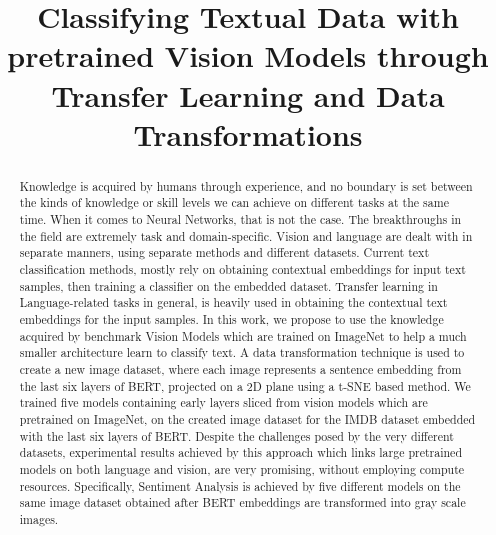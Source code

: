 \documentclass[conference]{IEEEtran}
\begin{document}
\title{Classifying Textual Data with pretrained Vision Models through Transfer Learning and Data \\
Transformations
}


\author{
}

\maketitle


\begin{abstract}
Knowledge is acquired by humans through experience, and no boundary is set between the kinds of knowledge or skill levels we can achieve on different tasks at the same time. When it comes to Neural Networks, that is not the case. The breakthroughs in the field are extremely task and domain-specific. Vision and language are dealt with in separate manners, using separate methods and different datasets. Current text classification methods, mostly rely on obtaining contextual embeddings for input text samples, then training a classifier on the embedded dataset. Transfer learning in Language-related tasks in general, is heavily used in obtaining the contextual text embeddings for the input samples. 
In this work, we propose to use the knowledge acquired by benchmark Vision Models which are trained on ImageNet to help a much smaller architecture learn to classify text. A data transformation technique is used to create a new image dataset, where each image represents a sentence embedding from the last six layers of BERT, projected on a 2D plane using a t-SNE based method. 
We trained five models containing early layers sliced from vision models which are  pretrained on ImageNet, on the created image dataset for the IMDB dataset embedded with the last six layers of BERT.
Despite the challenges posed by the very different datasets, experimental results achieved by this approach which links large pretrained models on both language and vision, are very promising, without employing compute resources. Specifically, Sentiment Analysis is achieved by five different models on the same image dataset obtained after BERT embeddings are transformed into gray scale images. 
\end{abstract}
\end{document}
